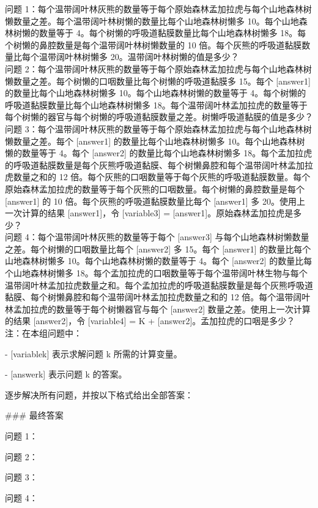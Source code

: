 \begin{systemprompt}[title={问题}]


问题 1：每个温带阔叶林灰熊的数量等于每个原始森林孟加拉虎与每个山地森林树懒数量之差。每个温带阔叶林树懒的数量比每个山地森林树懒多 10。每个山地森林树懒的数量等于 4。每个树懒的呼吸道黏膜数量比每个山地森林树懒多 18。每个树懒的鼻腔数量是每个温带阔叶林树懒数量的 10 倍。每个灰熊的呼吸道黏膜数量比每个温带阔叶林树懒多 20。温带阔叶林树懒的值是多少？\\

问题 2：每个温带阔叶林灰熊的数量等于每个原始森林孟加拉虎与每个山地森林树懒数量之差。每个树懒的口咽数量比每个树懒的呼吸道黏膜多 15。每个 [answer1] 的数量比每个山地森林树懒多 10。每个山地森林树懒的数量等于 4。每个树懒的呼吸道黏膜数量比每个山地森林树懒多 18。每个温带阔叶林孟加拉虎的数量等于每个树懒的器官与每个树懒的呼吸道黏膜数量之差。树懒呼吸道黏膜的值是多少？\\

问题 3：每个温带阔叶林灰熊的数量等于每个原始森林孟加拉虎与每个山地森林树懒数量之差。每个 [answer1] 的数量比每个山地森林树懒多 10。每个山地森林树懒的数量等于 4。每个 [answer2] 的数量比每个山地森林树懒多 18。每个孟加拉虎的呼吸道黏膜数量是每个灰熊呼吸道黏膜、每个树懒鼻腔和每个温带阔叶林孟加拉虎数量之和的 12 倍。每个灰熊的口咽数量等于每个灰熊的呼吸道黏膜数量。每个原始森林孟加拉虎的数量等于每个灰熊的口咽数量。每个树懒的鼻腔数量是每个 [answer1] 的 10 倍。每个灰熊的呼吸道黏膜数量比每个 [answer1] 多 20。使用上一次计算的结果 [answer1]，令 [variable3] = [answer1]。原始森林孟加拉虎是多少？\\

问题 4：每个温带阔叶林灰熊的数量等于每个 [answer3] 与每个山地森林树懒数量之差。每个树懒的口咽数量比每个 [answer2] 多 15。每个 [answer1] 的数量比每个山地森林树懒多 10。每个山地森林树懒的数量等于 4。每个 [answer2] 的数量比每个山地森林树懒多 18。每个孟加拉虎的口咽数量等于每个温带阔叶林生物与每个温带阔叶林孟加拉虎数量之和。每个孟加拉虎的呼吸道黏膜数量是每个灰熊呼吸道黏膜、每个树懒鼻腔和每个温带阔叶林孟加拉虎数量之和的 12 倍。每个温带阔叶林孟加拉虎的数量等于每个树懒器官与每个 [answer2] 数量之差。使用上一次计算的结果 [answer2]，令 [variable4] = K + [answer2]。孟加拉虎的口咽是多少？\\

注：在本组问题中：

- [variablek] 表示求解问题 k 所需的计算变量。

- [answerk] 表示问题 k 的答案。

逐步解决所有问题，并按以下格式给出全部答案：

\#\#\# 最终答案

问题 1：\boxed{[answer1]}

问题 2：\boxed{[answer2]}

问题 3：\boxed{[answer3]}

问题 4：\boxed{[answer4]}

\end{systemprompt}

